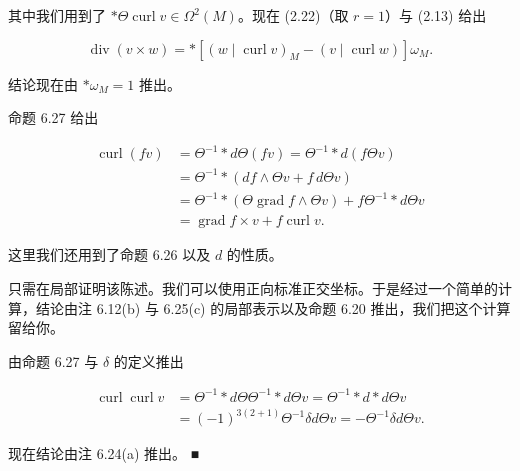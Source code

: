 \begin{proposition}
\begin{subitems}
其中我们用到了 $ \ast\Theta\operatorname{curl} v \in \Omega^{2}(M) $。现在 (2.22)（取 $ r = 1 $）与 (2.13) 给出

\[
\operatorname{div}(v\times w) = \ast\left[(w\mid\operatorname{curl} v)_{M} - (v\mid\operatorname{curl} w)\right]\omega_{M} .
\]

结论现在由 $ \ast\omega_{M} = 1 $ 推出。

\end{subitems}

\begin{subitems}
\item[（ii）]

命题 6.27 给出

\begin{equation*}
\begin{aligned}
\operatorname{curl}(fv) &= \Theta^{-1}\ast d\Theta(fv) = \Theta^{-1}\ast d(f\Theta v) \\ &= \Theta^{-1}\ast(df\wedge\Theta v + f\, d\Theta v) \\ &= \Theta^{-1}\ast(\Theta\operatorname{grad} f\wedge\Theta v) + f\Theta^{-1}\ast d\Theta v \\ &= \operatorname{grad} f\times v + f\operatorname{curl} v .
\end{aligned}
\end{equation*}

这里我们还用到了命题 6.26 以及 $ d $ 的性质。

\item[（iii）]

只需在局部证明该陈述。我们可以使用正向标准正交坐标。于是经过一个简单的计算，结论由注 6.12(b) 与 6.25(c) 的局部表示以及命题 6.20 推出，我们把这个计算留给你。

\item[（iv）]

由命题 6.27 与 $ \delta $ 的定义推出

\begin{equation*}
\begin{aligned}
\operatorname{curl}\operatorname{curl} v &= \Theta^{-1}\ast d\Theta\Theta^{-1}\ast d\Theta v = \Theta^{-1}\ast d\ast d\Theta v \\ &= (-1)^{3(2+1)}\Theta^{-1}\delta d\Theta v = -\Theta^{-1}\delta d\Theta v .
\end{aligned}
\end{equation*}

现在结论由注 6.24(a) 推出。 \nobreak\hspace{0.35em}■

\end{subitems}

\end{proposition}

